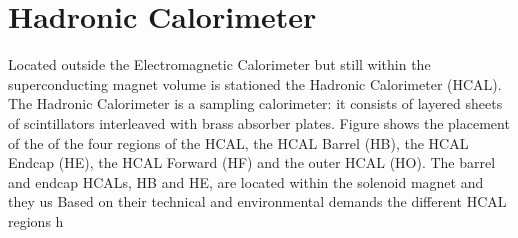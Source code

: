 \section{Hadronic Calorimeter}
Located outside the Electromagnetic Calorimeter but still within the
superconducting magnet volume is stationed the Hadronic Calorimeter (HCAL).
The Hadronic Calorimeter is a sampling calorimeter: it consists of layered 
sheets of scintillators interleaved with brass absorber plates. Figure %
shows the placement of the of the four regions of the HCAL, the HCAL Barrel (HB),
the HCAL Endcap (HE), the HCAL Forward (HF) and the outer HCAL (HO). 
The barrel and endcap HCALs, HB and HE, are located within the 
solenoid magnet and they us 
Based on their technical and environmental demands the different HCAL
regions h
